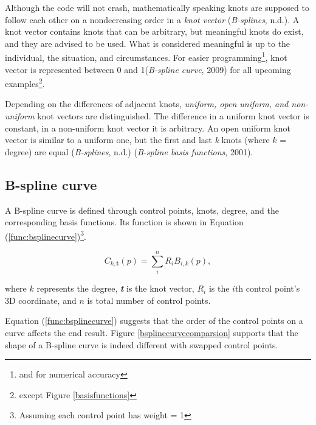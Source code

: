 \documentclass{article}
\begin{document}
Although the code will not crash, mathematically speaking knots are supposed to follow each other on a nondecreasing order in a \emph{knot vector} (\emph{B-splines}, n.d.). A knot vector contains knots that can be arbitrary, but meaningful knots do exist, and they are advised to be used. What is considered meaningful is up to the individual, the situation, and circumstances. For easier programming\footnote{and for numerical accuracy}, knot vector is represented between 0 and 1(\emph{B-spline curve}, 2009) for all upcoming examples\footnote{except Figure \ref{basisfunctions}}.

Depending on the differences of adjacent knots, \emph{uniform, open uniform, and non-uniform} knot vectors are distinguished. The difference in a uniform knot vector is constant, in a non-uniform knot vector it is arbitrary. An open uniform knot vector is similar to a uniform one, but the first and last \emph{k} knots (where $k$ = degree) are equal (\emph{B-splines}, n.d.) (\emph{B-spline basis functions}, 2001).

\subsection{B-spline curve}

\vspace{6pt}
A B-spline curve is defined through control points, knots, degree, and the corresponding basis functions. Its function is shown in Equation (\ref{func:bsplinecurve})\footnote{Assuming each control point has weight = 1}.

\begin{equation}
C_{k, \mathbf{t}}(p) = \sum_{i}^n R_{i} B_{i, k}(p),
\label{func:bsplinecurve}
\end{equation}

where $k$ represents the degree, \emph{\textbf{t}} is the knot vector, $R_i$ is the $i$th control point's 3D coordinate, and $n$ is total number of control points.

Equation (\ref{func:bsplinecurve}) suggests that the order of the control points on a curve affects the end result. Figure \ref{bsplinecurvecomparsion} supports that the shape of a B-spline curve is indeed different with swapped control points.
\end{document}
